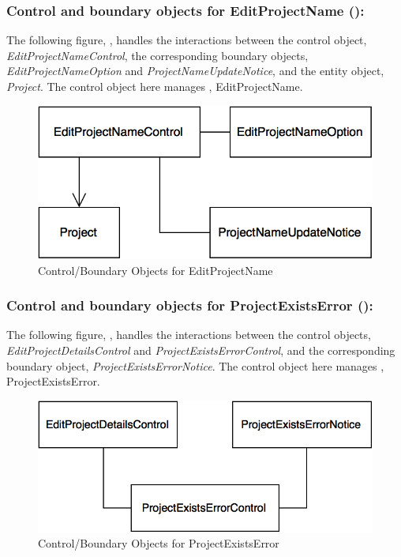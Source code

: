 \documentclass[12pt,letterpaper]{article}
\begin{document}
\subsubsection*{Control and boundary objects for EditProjectName ():}

The following figure, , handles the interactions between the control object, {\it EditProjectNameControl}, the corresponding boundary objects, {\it EditProjectNameOption} and {\it ProjectNameUpdateNotice}, and the entity object, {\it Project}. The control object here manages , EditProjectName.

\begin{figure}[H]
	\centering{}
	\includegraphics[scale=0.37]{imgs/cbod/edit-project-name.png}
	\caption{Control/Boundary Objects for EditProjectName}
\end{figure}

\subsubsection*{Control and boundary objects for ProjectExistsError ():}

The following figure, , handles the interactions between the control objects, {\it EditProjectDetailsControl} and {\it ProjectExistsErrorControl}, and the corresponding boundary object, {\it ProjectExistsErrorNotice}. The control object here manages , ProjectExistsError.

\begin{figure}[H]
	\centering{}
	\includegraphics[scale=0.37]{imgs/cbod/project-exists-error.png}
	\caption{Control/Boundary Objects for ProjectExistsError}
\end{figure}
\end{document}
